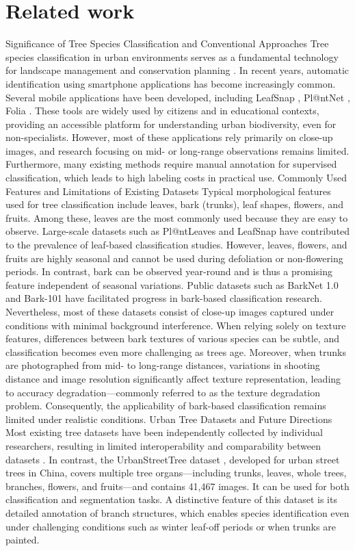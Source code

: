 \documentclass{article}
\begin{document}
\section{Related work}
Significance of Tree Species Classification and Conventional Approaches
	Tree species classification in urban environments serves as a fundamental technology for landscape management and conservation planning \cite{ref4}. In recent years, automatic identification using smartphone applications has become increasingly common. Several mobile applications have been developed, including LeafSnap \cite{ref5}, Pl@ntNet \cite{ref6}, Folia \cite{ref7}. These tools are widely used by citizens and in educational contexts, providing an accessible platform for understanding urban biodiversity, even for non-specialists. However, most of these applications rely primarily on close-up images, and research focusing on mid- or long-range observations remains limited. Furthermore, many existing methods require manual annotation for supervised classification, which leads to high labeling costs in practical use. 
Commonly Used Features and Limitations of Existing Datasets
Typical morphological features used for tree classification include leaves, bark (trunks), leaf shapes, flowers, and fruits. Among these, leaves are the most commonly used because they are easy to observe. Large-scale datasets such as Pl@ntLeaves \cite{ref8} and LeafSnap \cite{ref5} have contributed to the prevalence of leaf-based classification studies. However, leaves, flowers, and fruits are highly seasonal and cannot be used during defoliation or non-flowering periods. In contrast, bark can be observed year-round and is thus a promising feature independent of seasonal variations. Public datasets such as BarkNet 1.0 \cite{ref9} and Bark-101 \cite{ref10} have facilitated progress in bark-based classification research. Nevertheless, most of these datasets consist of close-up images captured under conditions with minimal background interference. When relying solely on texture features, differences between bark textures of various species can be subtle, and classification becomes even more challenging as trees age. Moreover, when trunks are photographed from mid- to long-range distances, variations in shooting distance and image resolution significantly affect texture representation, leading to accuracy degradation—commonly referred to as the texture degradation problem. Consequently, the applicability of bark-based classification remains limited under realistic conditions.
Urban Tree Datasets and Future Directions
Most existing tree datasets have been independently collected by individual researchers, resulting in limited interoperability and comparability between datasets \cite{ref4}. In contrast, the UrbanStreetTree dataset \cite{ref11}, developed for urban street trees in China, covers multiple tree organs—including trunks, leaves, whole trees, branches, flowers, and fruits—and contains 41,467 images. It can be used for both classification and segmentation tasks. A distinctive feature of this dataset is its detailed annotation of branch structures, which enables species identification even under challenging conditions such as winter leaf-off periods or when trunks are painted.
\end{document}
